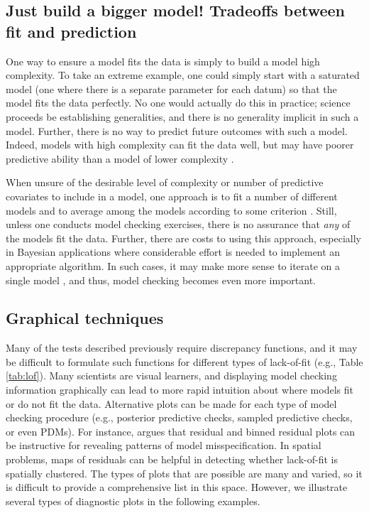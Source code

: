\documentclass[12pt,english]{article}
\begin{document}
\begin{spacing}{1.9}
\subsection{Just build a bigger model!  Tradeoffs between fit and prediction}

One way to ensure a model fits the data is simply to build a model high complexity.  To take an extreme example, one could simply start with a saturated model (one where there is a separate parameter for each datum) so that the model fits the data perfectly.  No one would actually do this in practice; science proceeds be establishing generalities, and there is no generality implicit in such a model.  Further, there is no way to predict future outcomes with such a model.  Indeed, models with high complexity can fit the data well, but may have poorer predictive ability than a model of lower complexity \citep{BurnhamAnderson2002,HootenHobbs2015}.

When unsure of the desirable level of complexity or number of predictive covariates to include in a model, one approach is to fit a number of different models and to average among the models according to some criterion \citep[see, e.g.,][]{Green1995,HoetingEtAl1999,LinkBarker2006}. Still, unless one conducts model checking exercises, there is no assurance that \textit{any} of the models fit the data.  Further, there are costs to using this approach, especially in Bayesian applications where considerable effort is needed to implement an appropriate algorithm.  In such cases, it may make more sense to iterate on a single model \citep{VerHoefBoveng2015}, and thus, model checking becomes even more important.

\subsection{Graphical techniques}

Many of the tests described previously require discrepancy functions, and it may be difficult to formulate such functions for different types of lack-of-fit (e.g., Table \ref{tab:lof}).  Many scientists are visual learners, and displaying model checking information graphically can lead to more rapid intuition about where models fit or do not fit the data.  Alternative plots can be made for each type of model checking procedure (e.g., posterior predictive checks, sampled predictive checks, or even PDMs).  For instance, \citet{GelmanEtAl2014} argues that residual and binned residual plots can be instructive for revealing patterns of model misspecification.  In spatial problems, maps of residuals can be helpful in detecting whether lack-of-fit is spatially clustered.  The types of plots that are possible are many and varied, so it is difficult to provide a comprehensive list in this space. However, we illustrate several types of diagnostic plots in the following examples.


\end{spacing}
\end{document}

